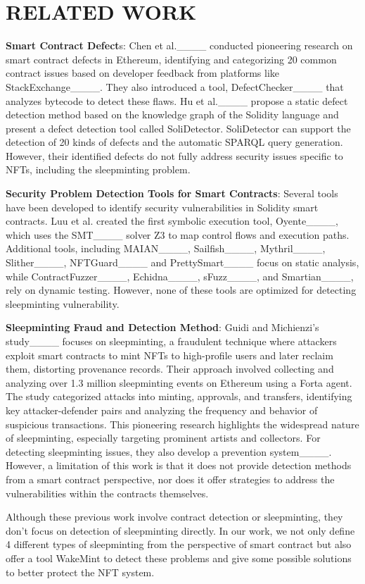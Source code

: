 \section{RELATED WORK}
\label{s7}
\textbf{Smart Contract Defect}s: Chen et al.____ conducted pioneering research on smart contract defects in Ethereum, identifying and categorizing 20 common contract issues based on developer feedback from platforms like StackExchange____. They also introduced a tool, DefectChecker____ that analyzes bytecode to detect these flaws. Hu et al.____ propose a static defect detection method based on the knowledge graph of the Solidity language and present a defect detection tool called SoliDetector. SoliDetector can support the detection of 20 kinds of defects and the automatic SPARQL query generation. However, their identified defects do not fully address security issues specific to NFTs, including the sleepminting problem.

\textbf{Security Problem Detection Tools for Smart Contracts}: Several tools have been developed to identify security vulnerabilities in Solidity smart contracts. Luu et al. created the first symbolic execution tool, Oyente____, which uses the SMT____ solver Z3 to map control flows and execution paths. Additional tools, including MAIAN____, Sailfish____, Mythril____, Slither____, NFTGuard____ and PrettySmart____ focus on static analysis, while ContractFuzzer____, Echidna____, sFuzz____, and Smartian____, rely on dynamic testing. However, none of these tools are optimized for detecting sleepminting vulnerability.

\textbf{Sleepminting Fraud and Detection Method}: Guidi and Michienzi's study____ focuses on sleepminting, a fraudulent technique where attackers exploit smart contracts to mint NFTs to high-profile users and later reclaim them, distorting provenance records. Their approach involved collecting and analyzing over 1.3 million sleepminting events on Ethereum using a Forta agent. The study categorized attacks into minting, approvals, and transfers, identifying key attacker-defender pairs and analyzing the frequency and behavior of suspicious transactions. This pioneering research highlights the widespread nature of sleepminting, especially targeting prominent artists and collectors. For detecting sleepminting issues, they also develop a prevention system____. However, a limitation of this work is that it does not provide detection methods from a smart contract perspective, nor does it offer strategies to address the vulnerabilities within the contracts themselves.

Although these previous work involve contract detection or sleepminting, they don't focus on detection of sleepminting directly. In our work, we not only define 4 different types of sleepminting from the perspective of smart contract but also offer a tool WakeMint to detect these problems and give some possible solutions to better protect the NFT system.